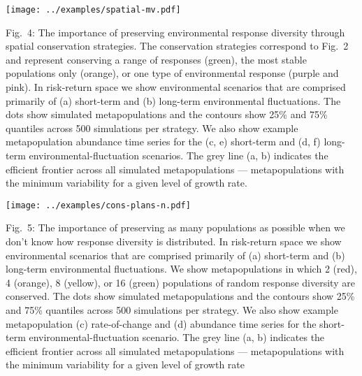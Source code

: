 \documentclass[11pt]{article}
\begin{document}
\begin{spacing}{1.4}
\clearpage

\begin{center}
\texttt{[image: ../examples/spatial-mv.pdf]}
\end{center}
Fig.\ 4: The importance of preserving environmental response diversity through spatial conservation strategies. The conservation strategies correspond to Fig.\ 2 and represent conserving a range of responses (green), the most stable populations only (orange), or one type of environmental response (purple and pink). In risk-return space we show environmental scenarios that are comprised primarily of (a) short-term and (b) long-term environmental fluctuations. The dots show simulated metapopulations and the contours show 25\% and 75\% quantiles across 500 simulations per strategy. We also show example metapopulation abundance time series for the (c, e) short-term and (d, f) long-term environmental-fluctuation scenarios. The grey line (a, b) indicates the efficient frontier across all simulated metapopulations --- metapopulations with the minimum variability for a given level of growth rate.

\clearpage

\begin{center}
\texttt{[image: ../examples/cons-plans-n.pdf]}
\end{center}
Fig.\ 5: The importance of preserving as many populations as possible when we don't know how response diversity is distributed. In risk-return space we show environmental scenarios that are comprised primarily of (a) short-term and (b) long-term environmental fluctuations. We show metapopulations in which 2 (red), 4 (orange), 8 (yellow), or 16 (green) populations of random response diversity are conserved. The dots show simulated metapopulations and the contours show 25\% and 75\% quantiles across 500 simulations per strategy. We also show example metapopulation (c) rate-of-change and (d) abundance time series for the short-term environmental-fluctuation scenario. The grey line (a, b) indicates the efficient frontier across all simulated metapopulations --- metapopulations with the minimum variability for a given level of growth rate

\end{spacing}

\setlength{\parskip}{8pt}
\setlength{\parindent}{0cm}

\begin{spacing}{1.2}



\end{spacing}
\end{document}
